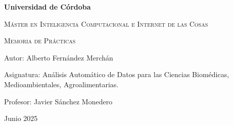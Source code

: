 \begin{titlepage}


\centering
\vspace{4cm}
{\bfseries\LARGE Universidad de Córdoba\par}
\vspace{0.5cm}
{\scshape\Large Máster en Inteligencia Computacional e Internet de las Cosas \par}
\vspace{3cm}
{\scshape\Huge Memoria de Prácticas \par}
\vspace{1cm}
{\scshape\Large  \par}
\vspace{1.5cm}
{\itshape\Large  \par}
\vfill
{\Large Autor: Alberto Fernández Merchán \par}
{\Large Asignatura: Análisis Automático de Datos para las Ciencias Biomédicas, Medioambientales,
Agroalimentarias. \par}
\vfill
{\Large Profesor: Javier Sánchez Monedero \par}
{\Large Junio 2025}
{\Large  \par}
\end{titlepage}